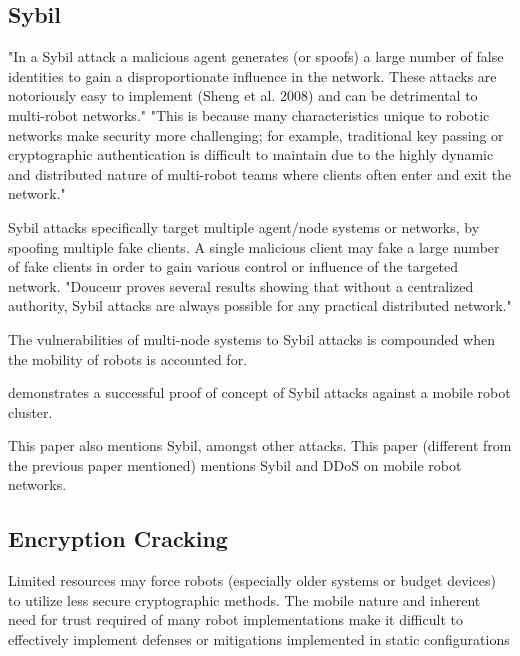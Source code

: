 \subsection{Sybil}
\cite{Gil2017GuaranteeingSM}
"In a Sybil attack a malicious agent generates (or spoofs) a large number of false identities to gain a disproportionate influence in the network. These attacks are notoriously easy to implement (Sheng et al. 2008) and can be detrimental to multi-robot networks."
"This is because many characteristics unique to robotic networks make security more challenging; for example, traditional key passing or cryptographic authentication is difficult to maintain due to the highly dynamic and distributed nature of multi-robot teams where clients often enter and exit the network."

Sybil attacks specifically target multiple agent/node systems or networks, by spoofing multiple fake clients.  A single malicious client may fake a large number of fake clients in order to gain various control or influence of the targeted network.  
"Douceur proves several results showing that without a centralized authority, Sybil attacks are always possible for any practical distributed network."

The vulnerabilities of multi-node systems to Sybil attacks is compounded when the mobility of robots is accounted for.  

demonstrates a successful proof of concept of Sybil attacks against a mobile robot cluster. 

This paper \cite{Basan:2017} also mentions Sybil, amongst other attacks.
This paper \cite{Basan2018} (different from the previous paper mentioned) mentions Sybil and DDoS on mobile robot networks.

\subsection{Encryption Cracking}
Limited resources may force robots (especially older systems or budget devices) to utilize less secure cryptographic methods.  The mobile nature and inherent need for trust required of many robot implementations make it difficult to effectively implement defenses or mitigations implemented in static configurations


